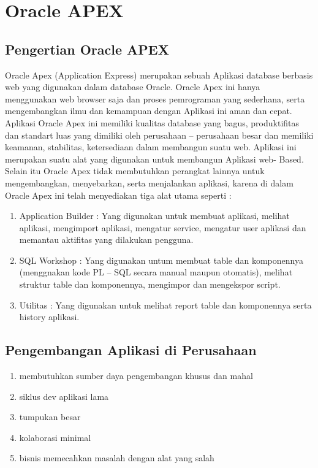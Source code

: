 \chapter{Oracle APEX}

\section{Pengertian Oracle APEX}
Oracle Apex (Application Express) merupakan sebuah Aplikasi database berbasis web yang digunakan dalam database Oracle. Oracle Apex ini hanya menggunakan web browser saja dan proses pemrograman yang sederhana, serta mengembangkan ilmu dan kemampuan dengan Aplikasi ini aman dan cepat. Aplikasi Oracle Apex ini memiliki kualitas database yang bagus, produktifitas dan standart luas yang dimiliki oleh perusahaan – perusahaan besar dan memiliki keamanan, stabilitas, ketersediaan dalam membangun suatu web. Aplikasi ini merupakan suatu alat yang digunakan untuk membangun Aplikasi web- Based. Selain itu Oracle Apex tidak membutuhkan perangkat lainnya untuk mengembangkan, menyebarkan, serta menjalankan aplikasi, karena di dalam Oracle Apex ini telah menyediakan tiga alat utama seperti : 
\begin{enumerate}
    \item Application Builder : Yang digunakan untuk membuat aplikasi, melihat aplikasi, mengimport aplikasi, mengatur service, mengatur user aplikasi dan memantau aktifitas yang dilakukan pengguna.
    \item SQL Workshop : Yang digunakan untum membuat table dan komponennya (menggnakan kode PL – SQL secara manual maupun otomatis), melihat struktur table dan komponennya, mengimpor dan mengekspor script.
    \item Utilitas : Yang digunakan untuk melihat report table dan komponennya serta history aplikasi.
\end{enumerate}

\section{Pengembangan Aplikasi di Perusahaan}
\begin{enumerate}
    \item membutuhkan sumber daya pengembangan khusus dan mahal
    \item siklus dev aplikasi lama
    \item tumpukan besar
    \item kolaborasi minimal
    \item bisnis memecahkan masalah dengan alat yang salah
\end{enumerate}

